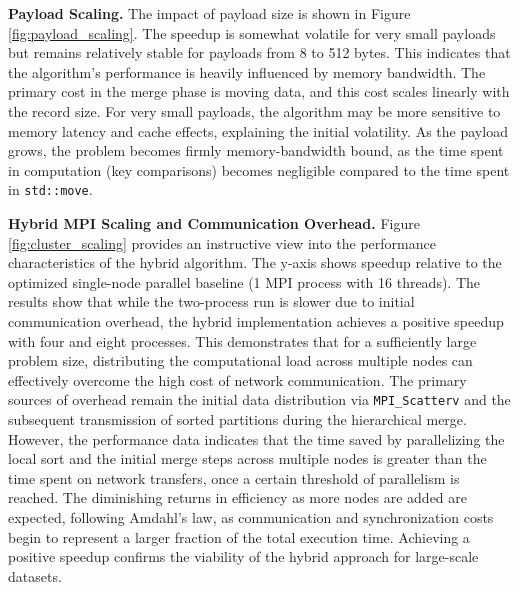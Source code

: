 \documentclass[10pt]{article}
\newcommand{\code}[1]{\texttt{#1}}
\begin{document}
\textbf{Payload Scaling.} The impact of payload size is shown in Figure \ref{fig:payload_scaling}. The speedup is somewhat volatile for very small payloads but remains relatively stable for payloads from 8 to 512 bytes. This indicates that the algorithm's performance is heavily influenced by memory bandwidth. The primary cost in the merge phase is moving data, and this cost scales linearly with the record size. For very small payloads, the algorithm may be more sensitive to memory latency and cache effects, explaining the initial volatility. As the payload grows, the problem becomes firmly memory-bandwidth bound, as the time spent in computation (key comparisons) becomes negligible compared to the time spent in \code{std::move}.

\textbf{Hybrid MPI Scaling and Communication Overhead.} Figure \ref{fig:cluster_scaling} provides an instructive view into the performance characteristics of the hybrid algorithm. The y-axis shows speedup relative to the optimized single-node parallel baseline (1 MPI process with 16 threads). The results show that while the two-process run is slower due to initial communication overhead, the hybrid implementation achieves a positive speedup with four and eight processes. This demonstrates that for a sufficiently large problem size, distributing the computational load across multiple nodes can effectively overcome the high cost of network communication. The primary sources of overhead remain the initial data distribution via \code{MPI\_Scatterv} and the subsequent transmission of sorted partitions during the hierarchical merge. However, the performance data indicates that the time saved by parallelizing the local sort and the initial merge steps across multiple nodes is greater than the time spent on network transfers, once a certain threshold of parallelism is reached. The diminishing returns in efficiency as more nodes are added are expected, following Amdahl's law, as communication and synchronization costs begin to represent a larger fraction of the total execution time. Achieving a positive speedup confirms the viability of the hybrid approach for large-scale datasets.
\end{document}
